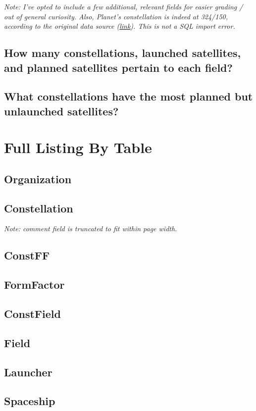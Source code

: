 \documentclass{article}
\begin{document}
    \textit{Note: I've opted to include a few additional, relevant fields for easier grading / out of general curiosity. Also, Planet's constellation is indeed at 324/150, according to the original data source (\href{https://www.newspace.im/}{link}). This is not a SQL import error.}
    
    \subsection{How many constellations, launched satellites, and planned satellites pertain to each field?}
    
    \subsection{What constellations have the most planned but unlaunched satellites?}

\section{Full Listing By Table}

\subsection{Organization}

\subsection{Constellation}
\textit{Note: comment field is truncated to fit within page width.}

\subsection{ConstFF}

\subsection{FormFactor}

\subsection{ConstField}

\subsection{Field}

\subsection{Launcher}

\subsection{Spaceship}
\end{document}
